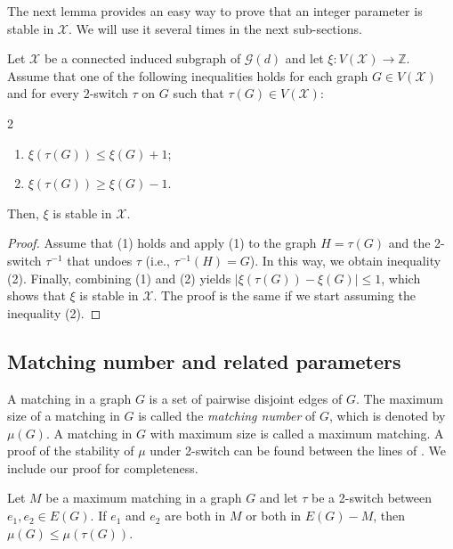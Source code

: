 \documentclass{BICA}
\begin{document}
The next lemma provides an easy way to prove that an integer parameter is stable in $\mathcal{X}$. We will use it several times in the next sub-sections.

\begin{lemma}\label{lemastable}
	Let $\mathcal{X}$ be a connected induced subgraph of $\mathcal{G}(d)$ and let $\xi:V(\mathcal{X})\rightarrow\mathbb{Z}$. Assume that one of the following inequalities holds for each graph $G\in V(\mathcal{X})$ and for every $2$-switch $\tau$ on $G$ such that $\tau(G)\in V(\mathcal{X})$:
	\begin{multicols}{2}
		\begin{enumerate}
			\item $\xi(\tau(G))\leq \xi(G)+1$;
			\item $\xi(\tau(G))\geq \xi(G)-1$.
		\end{enumerate}
	\end{multicols}
	Then, $\xi$ is stable in $\mathcal{X}$.
\end{lemma}

\begin{proof}
	Assume that (1) holds and apply (1) to the graph $H=\tau(G)$ and the 2-switch $\tau^{-1}$ that undoes $\tau$ (i.e., $\tau^{-1}(H)=G$). In this way, we obtain inequality (2). Finally, combining (1) and (2) yields $\left| \xi\left(\tau(G)\right)-\xi(G)\right|\leq 1$, which shows that $\xi$ is stable in $\mathcal{X}$. The proof is the same if we start assuming the inequality (2).
\end{proof}

\subsection{Matching number and related parameters}\label{sectionmatchingnumber}

A matching in a graph $G$ is a set of pairwise disjoint edges of $G$. The maximum size of a matching in $G$ is called the \emph{matching number} of $G$, which is denoted by $\mu(G)$. A matching in \(G\) with maximum size is called a maximum matching. A proof of the stability of $\mu$ under 2-switch can be found between the lines of \cite{BockRat}.
We include our proof for completeness.

\begin{lemma}
	\label{matchlem1}
	Let $M$ be a maximum matching in a graph $G$ and let $\tau$ be a 2-switch between $e_{1},e_{2}\in E(G)$. If $e_{1}$ and $e_{2}$ are both in $M$ or both in $E(G)-M$, then $\mu(G)\leq \mu(\tau (G))$.
\end{lemma}
\end{document}
